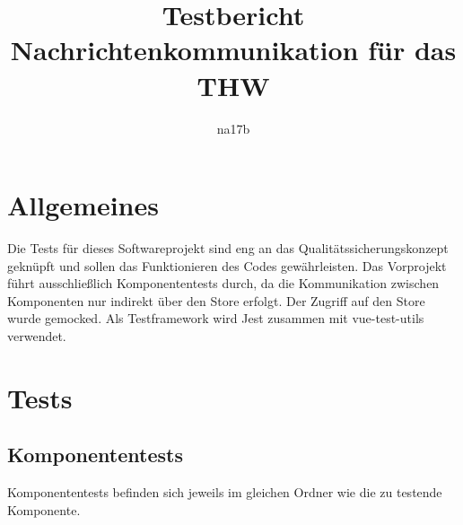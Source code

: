 \documentclass[a4paper,11pt,oneside, titlepage]{article}
\title{Testbericht\\Nachrichtenkommunikation für das THW}
\author{na17b}
\date{}
\begin{document}
\maketitle

\tableofcontents

\newpage

\section{Allgemeines}
Die Tests für dieses Softwareprojekt sind eng an das Qualitätssicherungskonzept geknüpft und sollen das Funktionieren des Codes gewährleisten. Das Vorprojekt führt ausschließlich Komponententests durch, da die Kommunikation zwischen Komponenten nur indirekt über den Store erfolgt. Der Zugriff auf den Store wurde gemocked. Als Testframework wird \gls{Jest} zusammen mit \gls{vue-test-utils} verwendet.
\section{Tests}
\subsection{Komponententests}
Komponententests befinden sich jeweils im gleichen Ordner wie die zu testende Komponente.
\end{document}
